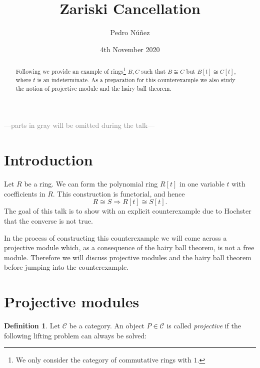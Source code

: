 \documentclass[A4paper, 12pt, british, reqno]{amsart}
\author{Pedro N\'{u}\~{n}ez}
\title[Zariski Cancellation]{Zariski Cancellation}
\date{4th November 2020}
\newcommand{\calC}{\mathcal{C}}
\theoremstyle{plain}
\theoremstyle{definition}
\newtheorem{defn}[thm]{Definition}
\theoremstyle{remark}
\theoremstyle{plain}
\theoremstyle{definition}
\theoremstyle{remark}
\theoremstyle{plain}
\theoremstyle{definition}
\theoremstyle{remark}
\begin{document}

\maketitle

\begin{abstract}
    Following \cite{hoc72} we provide an example of rings\footnote{We only consider the category of commutative rings with $1$.} $B,C$ such that $B\not\cong C$ but $B[t]\cong C[t]$, where $t$ is an indeterminate.
    As a preparation for this counterexample we also study the notion of projective module and the hairy ball theorem.	
\end{abstract}

\tableofcontents

\begin{center}
    \textcolor{gray}{---parts in gray will be omitted during the talk---}
\end{center}

\section{Introduction}

Let $R$ be a ring.
We can form the polynomial ring $R[t]$ in one variable $t$ with coefficients in $R$.
This construction is functorial, and hence
\[ R\cong S \Rightarrow R[t]\cong S[t]. \]
The goal of this talk is to show with an explicit counterexample due to Hochster \cite{hoc72} that the converse is not true.

In the process of constructing this counterexample we will come across a projective module which, as a consequence of the hairy ball theorem, is not a free module.
Therefore we will discuss projective modules and the hairy ball theorem before jumping into the counterexample.

\section{Projective modules}

\begin{defn}
    Let $\calC$ be a category.
    An object $P\in \calC$ is called \textit{projective} if the following lifting problem can always be solved:
    
    \begin{center}
    \end{center}
\end{defn}
\end{document}
